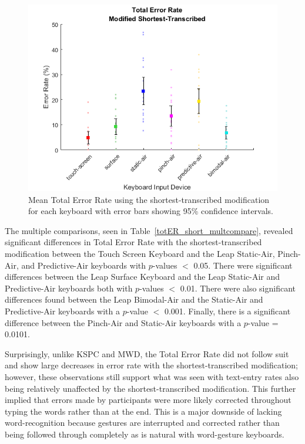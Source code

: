 \begin{figure}[h]
	\centering
	\includegraphics{fig_totER_short_mean}
	\caption[Mean Total Error Rate for Modified-Shortest]{Mean Total Error Rate using the shortest-transcribed modification for each keyboard with error bars showing 95\% confidence intervals.}
	\label{fig_totER_short_mean}
\end{figure}

The multiple comparisons, seen in Table~\ref{totER_short_multcompare}, revealed significant differences in Total Error Rate with the shortest-transcribed modification between the Touch Screen Keyboard and the Leap Static-Air, Pinch-Air, and Predictive-Air keyboards with $p$-values $<$ 0.05. There were significant differences between the Leap Surface Keyboard and the Leap Static-Air and Predictive-Air keyboards both with $p$-values $<$ 0.01. There were also significant differences found between the Leap Bimodal-Air and the Static-Air and Predictive-Air keyboards with a $p$-value $<$ 0.001. Finally, there is a significant difference between the Pinch-Air and Static-Air keyboards with a $p$-value = 0.0101.

Surprisingly, unlike KSPC and MWD, the Total Error Rate did not follow suit and show large decreases in error rate with the shortest-transcribed modification; however, these observations still support what was seen with text-entry rates also being relatively unaffected by the shortest-transcribed modification. This further implied that errors made by participants were more likely corrected throughout typing the words rather than at the end. This is a major downside of lacking word-recognition because gestures are interrupted and corrected rather than being followed through completely as is natural with word-gesture keyboards.

